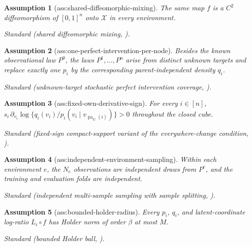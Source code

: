 \documentclass{article}
\newtheorem{assumption}{Assumption}
\begin{document}
\begin{assumption}[ass:shared-diffeomorphic-mixing]\label{ass:shared-diffeomorphic-mixing}
The same map \(f\) is a \(C^2\) diffeomorphism of \([0,1]^n\) onto \(\mathcal X\) in every environment.
\par\smallskip\noindent\emph{Standard} (shared diffeomorphic mixing, \cite{vonKugelgenEtAl2023UnknownInterventions}).
\end{assumption}

\begin{assumption}[ass:one-perfect-intervention-per-node]\label{ass:one-perfect-intervention-per-node}
Besides the known observational law \(P^0\), the laws \(P^1,\ldots,P^n\) arise from distinct unknown targets and replace exactly one \(p_i\) by the corresponding parent-independent density \(q_i\).
\par\smallskip\noindent\emph{Standard} (unknown-target stochastic perfect intervention coverage, \cite{vonKugelgenEtAl2023UnknownInterventions}).
\end{assumption}

\begin{assumption}[ass:fixed-own-derivative-sign]\label{ass:fixed-own-derivative-sign}
For every \(i\in[n]\), \(s_i\,\partial_{v_i}\log\{q_i(v_i)/p_i(v_i\mid v_{\operatorname{pa}_G(i)})\}>0\) throughout the closed cube.
\par\smallskip\noindent\emph{Standard} (fixed-sign compact-support variant of the everywhere-change condition, \cite{vonKugelgenEtAl2023UnknownInterventions}).
\end{assumption}

\begin{assumption}[ass:independent-environment-sampling]\label{ass:independent-environment-sampling}
Within each environment \(e\), the \(N_e\) observations are independent draws from \(P^e\), and the training and evaluation folds are independent.
\par\smallskip\noindent\emph{Standard} (independent multi-sample sampling with sample splitting, \cite{GrettonEtAl2012KernelTwoSample}).
\end{assumption}

\begin{assumption}[ass:bounded-holder-radius]\label{ass:bounded-holder-radius}
Every \(p_i\), \(q_i\), and latent-coordinate log-ratio \(L_i\circ f\) has Holder norm of order \(\beta\) at most \(M\).
\par\smallskip\noindent\emph{Standard} (bounded Holder ball, \cite{Xie2023UniformConditionalCDF}).
\end{assumption}
\end{document}
